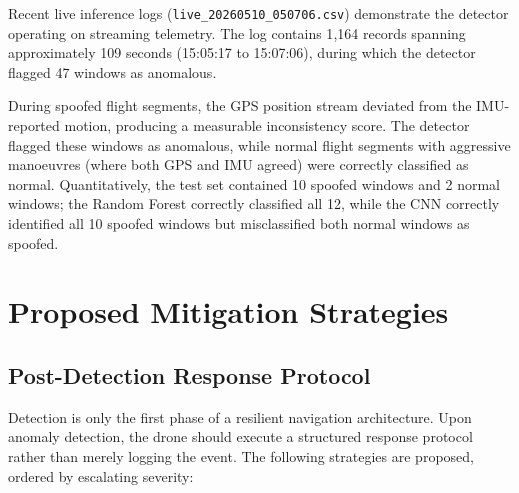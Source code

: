 \documentclass[11pt,a4paper]{article}
\begin{document}
Recent live inference logs (\texttt{live\_20260510\_050706.csv}) demonstrate the detector operating on streaming telemetry. The log contains 1{,}164 records spanning approximately 109 seconds (15:05:17 to 15:07:06), during which the detector flagged 47 windows as anomalous.

During spoofed flight segments, the GPS position stream deviated from the IMU-reported motion, producing a measurable inconsistency score. The detector flagged these windows as anomalous, while normal flight segments with aggressive manoeuvres (where both GPS and IMU agreed) were correctly classified as normal. Quantitatively, the test set contained 10 spoofed windows and 2 normal windows; the Random Forest correctly classified all 12, while the CNN correctly identified all 10 spoofed windows but misclassified both normal windows as spoofed.

\section{Proposed Mitigation Strategies}

\subsection{Post-Detection Response Protocol}

Detection is only the first phase of a resilient navigation architecture. Upon anomaly detection, the drone should execute a structured response protocol rather than merely logging the event. The following strategies are proposed, ordered by escalating severity:
\end{document}
